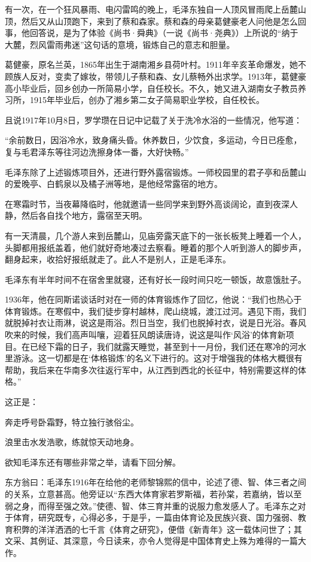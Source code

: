 \documentclass[../../dazhuan.tex]{subfiles}
\begin{document}
有一次，在一个狂风暴雨、电闪雷鸣的晚上，毛泽东独自一人顶风冒雨爬上岳麓山顶，然后又从山顶跑下，来到了蔡和森家。蔡和森的母亲葛健豪老人问他是怎么回事，他回答说，是为了体验《尚书·舜典》（一说《尚书·尧典》）上所说的“纳于大麓，烈风雷雨弗迷”这句话的意境，锻炼自己的意志和胆量。

葛健豪，原名兰英，1865年出生于湖南湘乡县荷叶村。1911年辛亥革命爆发，她不顾族人反对，变卖了嫁妆，带领儿子蔡和森、女儿蔡畅外出求学。1913年，葛健豪高小毕业后，回乡创办一所简易小学，自任校长。不久，她又进入湖南女子教员养习所，1915年毕业后，创办了湘乡第二女子简易职业学校，自任校长。

且说1917年10月8日，罗学瓒在日记中记载了关于洗冷水浴的一些情况，他写道：

“余前数日，因浴冷水，致身痛头昏。休养数日，少饮食，多运动，今日已痊愈，复与毛君泽东等往河边洗擦身体一番，大好快畅。”

毛泽东除了上述锻炼项目外，还进行野外露宿锻炼。一师校园里的君子亭和岳麓山的爱晚亭、白鹤泉以及橘子洲等地，是他经常露宿的地方。

在寒霜时节，当夜幕降临时，他就邀请一些同学来到野外高谈阔论，直到夜深人静，然后各自找个地方，露宿至天明。

有一天清晨，几个游人来到岳麓山，见庙旁露天底下的一张长板凳上睡着一个人，头脚都用报纸盖着，他们就好奇地凑过去察看。睡着的那个人听到游人的脚步声，翻身起来，收拾好报纸就走了。此人不是别人，正是毛泽东。

毛泽东有半年时间不在宿舍里就寝，还有好长一段时间只吃一顿饭，故意饿肚子。

1936年，他在同斯诺谈话时对在一师的体育锻炼作了回忆，他说：“我们也热心于体育锻炼。在寒假中，我们徒步穿村越林，爬山绕城，渡江过河。遇见下雨，我们就脱掉衬衣让雨淋，说这是雨浴。烈日当空，我们也脱掉衬衣，说是日光浴。春风吹来的时候，我们高声叫嚷，迎着狂风朗读唐诗，说这是叫作‘风浴’的体育新项目。在已经下霜的日子，我们就露天睡觉，甚至到十一月份，我们还在寒冷的河水里游泳。这一切都是在‘体格锻炼’的名义下进行的。这对于增强我的体格大概很有帮助，我后来在华南多次往返行军中，从江西到西北的长征中，特别需要这样的体格。”

这正是：\begin{xemph}奔走呼号卧霜野，特立独行骇俗尘。\end{xemph}


浪里击水发浩歌，练就惊天动地身。

欲知毛泽东还有哪些非常之举，请看下回分解。

东方翁曰：毛泽东1916年在给他的老师黎锦熙的信中，论述了德、智、体三者之间的关系，立意甚高。他旁证以“东西大体育家若罗斯福，若孙棠，若嘉纳，皆以至弱之身，而得至强之效。”使德、智、体三育并重的说服力愈发感人了。毛泽东之对于体育，研究既专，心得必多，于是乎，一篇由体育论及民族兴衰、国力强弱、教育积弊的洋洋洒洒的七千言《体育之研究》，便借《新青年》这一载体问世了；其文采、其例证、其深意，今日读来，亦令人觉得是中国体育史上殊为难得的一篇大作。
\end{document}
